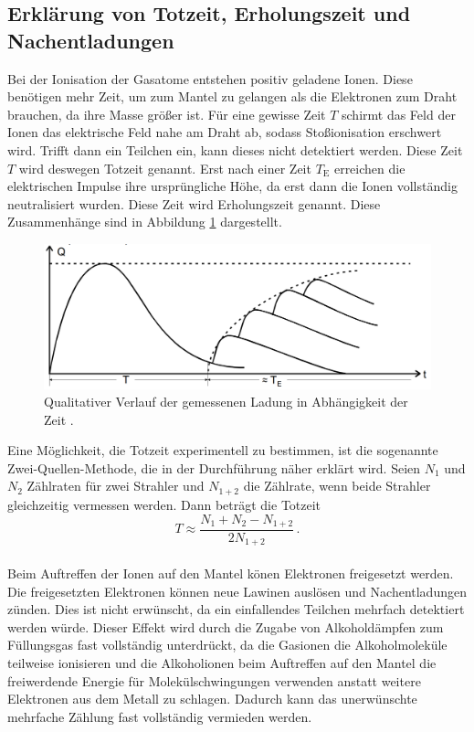 \subsection{Erklärung von Totzeit, Erholungszeit und Nachentladungen}
\label{subsec:theorie2}

Bei der Ionisation der Gasatome entstehen positiv geladene Ionen. Diese benötigen mehr Zeit,
um zum Mantel zu gelangen als die Elektronen zum Draht brauchen, da ihre Masse größer ist.
Für eine gewisse Zeit $T$ schirmt das Feld der Ionen das elektrische Feld nahe am Draht ab, sodass
Stoßionisation erschwert wird. Trifft dann ein Teilchen ein, kann dieses nicht detektiert werden.
Diese Zeit $T$ wird deswegen Totzeit genannt. Erst nach einer Zeit $T_\text{E}$ erreichen
die elektrischen Impulse ihre ursprüngliche Höhe, da erst dann die Ionen vollständig neutralisiert wurden.
Diese Zeit wird Erholungszeit genannt. Diese Zusammenhänge sind in Abbildung \ref{fig:qt}
dargestellt.

\begin{figure}
  \centering
  \includegraphics[width=\textwidth]{data/qt.png}
  \caption{Qualitativer Verlauf der gemessenen Ladung in Abhängigkeit der Zeit \cite{Versuchsanleitung}.}
  \label{fig:qt}
\end{figure}

Eine Möglichkeit, die Totzeit experimentell zu bestimmen, ist die sogenannte
Zwei-Quellen-Methode, die in der Durchführung näher erklärt wird. Seien $N_1$ und $N_2$
Zählraten für zwei Strahler und $N_{1+2}$ die Zählrate, wenn beide Strahler gleichzeitig vermessen werden.
Dann beträgt die Totzeit
\begin{equation}
  T \approx \frac{N_1 + N_2 - N_{1+2}}{2N_{1+2}}\,.
  \label{eqn:zweiquellentotzeit}
\end{equation}\\
Beim Auftreffen der Ionen auf den Mantel könen Elektronen freigesetzt werden.
Die freigesetzten Elektronen können neue Lawinen auslösen und Nachentladungen zünden.
Dies ist nicht erwünscht, da ein einfallendes Teilchen mehrfach detektiert werden würde.
Dieser Effekt wird durch die Zugabe von Alkoholdämpfen zum Füllungsgas fast vollständig
unterdrückt, da die Gasionen die Alkoholmoleküle teilweise ionisieren und die Alkoholionen
beim Auftreffen auf den Mantel die freiwerdende Energie für Molekülschwingungen verwenden anstatt
weitere Elektronen aus dem Metall zu schlagen. Dadurch kann das unerwünschte mehrfache Zählung
fast vollständig vermieden werden.

